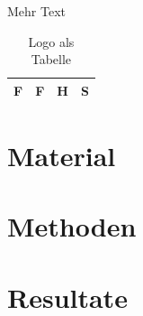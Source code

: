 \documentclass{ffhsthesis}
\begin{document}
Mehr Text\cite[p.~55]{Humble}
 
\begin{table}[ht]
  \begin{center}
  \begin{tabular}{|c|c|c|c|}
  \hline
  F & F & H & S \\
  \hline
  \end{tabular}
  \end{center}
  \caption{Logo als Tabelle}
\end{table}

\chapter{Material}

\chapter{Methoden}

\chapter{Resultate}



\listoffigures

\listoftables

% 
\printbibliography

\newpage
\end{document}
